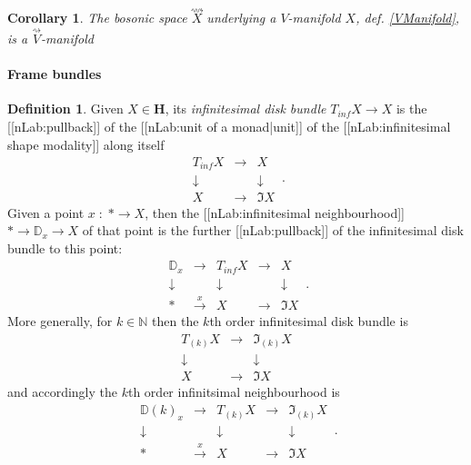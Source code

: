 \documentclass[12pt,titlepage]{article}
\newcommand{\itexarray}[1]{\begin{matrix}#1\end{matrix}}
\theoremstyle{plain}
\newtheorem{cor}{Corollary}
\theoremstyle{definition}
\newtheorem{defn}{Definition}
\theoremstyle{remark}
\begin{document}
\begin{cor}
\label{}\hypertarget{}{}
The bosonic space $\stackrel{\rightsquigarrow}{X}$ underlying a $V$-manifold $X$, def. \ref{VManifold}, is a $\stackrel{\rightsquigarrow}{V}$-manifold
\end{cor}
\hypertarget{FrameBundles}{}\paragraph*{{Frame bundles}}\label{FrameBundles}
\begin{defn}
\label{InfinitesimalDiskBundle}\hypertarget{InfinitesimalDiskBundle}{}
Given $X \in \mathbf{H}$, its \emph{infinitesimal disk bundle} $T_{inf} X\to X$ is the [[nLab:pullback]] of the [[nLab:unit of a monad|unit]] of the [[nLab:infinitesimal shape modality]] along itself
\begin{displaymath}
\itexarray{
    T_{inf} X &\stackrel{}{\longrightarrow}& X
    \\
    \downarrow && \downarrow
    \\
    X &\longrightarrow& \Im X
  }
  \,.
\end{displaymath}
Given a point $x \;\colon\;  \ast \to X$, then the [[nLab:infinitesimal neighbourhood]] $\ast \to \mathbb{D}_x \to X$ of that point is the further [[nLab:pullback]] of the infinitesimal disk bundle to this point:
\begin{displaymath}
\itexarray{
    \mathbb{D}_x &\longrightarrow & T_{inf} X &\stackrel{}{\longrightarrow}& X
    \\
    \downarrow && \downarrow && \downarrow
    \\
    \ast &\stackrel{x}{\longrightarrow} & X &\longrightarrow& \Im X
  }
  \,.
\end{displaymath}
More generally, for $k \in \mathbb{N}$ then the $k$th order infinitesimal disk bundle is
\begin{displaymath}
\itexarray{
    T_{(k)} X &\stackrel{}{\longrightarrow}& \Im_{(k)} X
    \\
    \downarrow && \downarrow
    \\
    X &\longrightarrow& \Im X
  }
\end{displaymath}
and accordingly the $k$th order infinitsimal neighbourhood is
\begin{displaymath}
\itexarray{
    \mathbb{D}(k)_x &\longrightarrow & T_{(k)} X &\stackrel{}{\longrightarrow}& \Im_{(k)}X
    \\
    \downarrow && \downarrow && \downarrow
    \\
    \ast &\stackrel{x}{\longrightarrow} & X &\longrightarrow& \Im X
  }
  \,.
\end{displaymath}
\end{defn}
\end{document}
